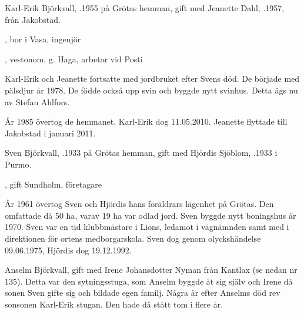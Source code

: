 %
Karl-Erik Björkvall, .1955 på Grötas hemman, gift med Jeanette Dahl, .1957, från Jakobstad.
\begin{jhchildren}
  \item {}, bor i Vasa, ingenjör
  \item {}, vestonom, g. Haga, arbetar vid Posti
\end{jhchildren}


%
Karl-Erik och Jeanette fortsatte med  jordbruket efter Svens död. De började med pälsdjur år 1978. De födde också upp svin och byggde nytt svinhus. Detta ägs nu av Stefan Ahlfors.

År 1985 övertog de hemmanet. Karl-Erik dog 11.05.2010. Jeanette flyttade till Jakobstad i januari 2011.


%
Sven Björkvall, .1933 på Grötas hemman, gift med Hjördis Sjöblom, .1933 i Purmo.
\begin{jhchildren}
  \item {}
  \item {}, gift Sundholm, företagare
\end{jhchildren}

År 1961 övertog Sven och Hjördis hans föräldrars lägenhet på Grötas. Den omfattade då 50 ha, varav 19 ha var odlad jord. Sven byggde nytt boningshus år 1970. Sven var en tid klubbmästare i Lions, ledamot i vägnämnden samt med i direktionen för ortens medborgarskola. Sven dog genom olyckshändelse 09.06.1975, Hjördis dog 19.12.1992.


%



%
Anselm  Björkvall,  gift med Irene Johansdotter Nyman från Kantlax (se nedan nr 135).
Detta var den sytningsstuga, som Anselm byggde åt sig själv och Irene då sonen Sven gifte sig och bildade egen familj. Några år efter Anselms död rev sonsonen Karl-Erik stugan. Den hade då stått tom i flere år.


